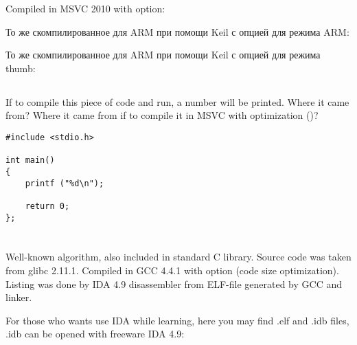 {Compiled in MSVC 2010 with  option:}



То же скомпилированное для ARM при помощи Keil с опцией \Othree для режима ARM:



То же скомпилированное для ARM при помощи Keil с опцией \Othree для режима thumb:



\subsection{}

{If to compile this piece of code and run, a number will be printed. Where it came from?
Where it came from if to compile it in MSVC with optimization (\Ox)?}

\begin{lstlisting}
#include <stdio.h>

int main()
{
	printf ("%d\n");

	return 0;
};
\end{lstlisting}

\section{}

\subsection{}

{Well-known algorithm, also included in standard C library. Source code was taken from glibc 2.11.1.
Compiled in GCC 4.4.1 with  option (code size optimization).
Listing was done by IDA 4.9 disassembler from ELF-file generated by GCC and linker.}

{For those who wants use IDA while learning, here you may find .elf and .idb files,
.idb can be opened with freeware IDA 4.9:}

